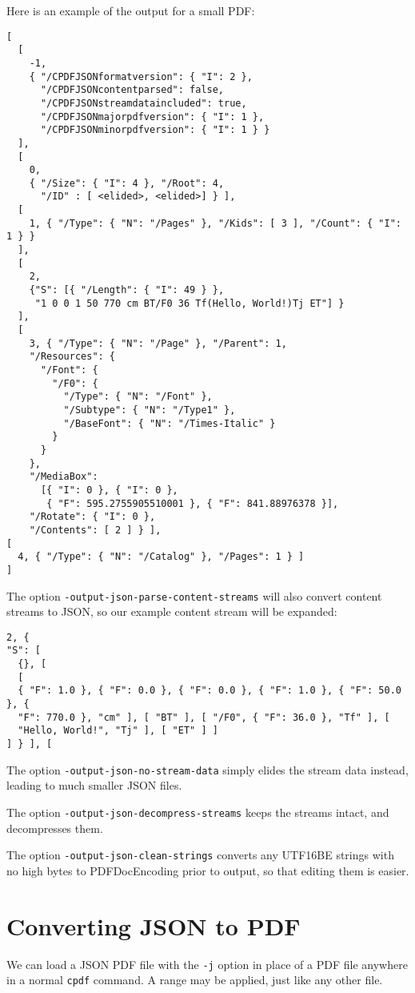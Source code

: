 \documentclass{book}
\begin{document}
\noindent Here is an example of the output for a small PDF:

{\small\begin{verbatim}
[
  [
    -1,
    { "/CPDFJSONformatversion": { "I": 2 },
      "/CPDFJSONcontentparsed": false,
      "/CPDFJSONstreamdataincluded": true,
      "/CPDFJSONmajorpdfversion": { "I": 1 },
      "/CPDFJSONminorpdfversion": { "I": 1 } }
  ],
  [
    0,
    { "/Size": { "I": 4 }, "/Root": 4,
      "/ID" : [ <elided>, <elided>] } ],
  [
    1, { "/Type": { "N": "/Pages" }, "/Kids": [ 3 ], "/Count": { "I": 1 } }
  ],
  [
    2,
    {"S": [{ "/Length": { "I": 49 } },
     "1 0 0 1 50 770 cm BT/F0 36 Tf(Hello, World!)Tj ET"] }
  ],
  [
    3, { "/Type": { "N": "/Page" }, "/Parent": 1,
    "/Resources": {
      "/Font": {
        "/F0": {
          "/Type": { "N": "/Font" },
          "/Subtype": { "N": "/Type1" },
          "/BaseFont": { "N": "/Times-Italic" }
        }
      }
    },
    "/MediaBox":
      [{ "I": 0 }, { "I": 0 },
       { "F": 595.2755905510001 }, { "F": 841.88976378 }],
    "/Rotate": { "I": 0 },
    "/Contents": [ 2 ] } ],
[
  4, { "/Type": { "N": "/Catalog" }, "/Pages": 1 } ]
]\end{verbatim}}

\noindent The option \texttt{-output-json-parse-content-streams} will also convert content streams to JSON, so our example content stream will be expanded:


{\small\begin{verbatim}
2, {
"S": [
  {}, [
  [
  { "F": 1.0 }, { "F": 0.0 }, { "F": 0.0 }, { "F": 1.0 }, { "F": 50.0 }, {
  "F": 770.0 }, "cm" ], [ "BT" ], [ "/F0", { "F": 36.0 }, "Tf" ], [
  "Hello, World!", "Tj" ], [ "ET" ] ]
] } ], [
\end{verbatim}}

\noindent The option \texttt{-output-json-no-stream-data} simply elides the stream data instead, 
leading to much smaller JSON files. 

The option \texttt{-output-json-decompress-streams} keeps the streams intact, and decompresses them.

The option \texttt{-output-json-clean-strings} converts any UTF16BE strings with no high bytes to PDFDocEncoding prior to output, so that editing them is easier. 

\section{Converting JSON to PDF}

We can load a JSON PDF file with the \texttt{-j} option in place of a PDF file anywhere in a normal \texttt{cpdf} command. A range may be applied, just like any other file. 
\end{document}
